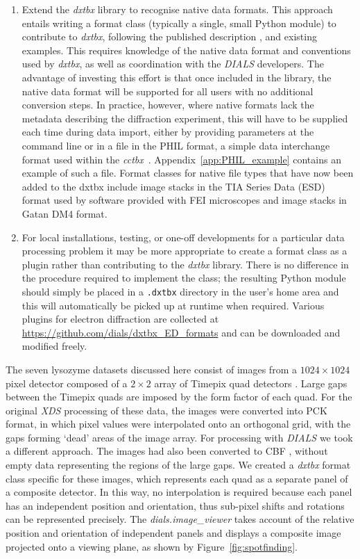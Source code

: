 \documentclass[preprint]{iucr}
\newcommand{\cctbx}{\emph{cctbx}\xspace}
\newcommand{\dxtbx}{\emph{dxtbx}\xspace}
\newcommand{\dials}{\emph{DIALS}\xspace}
\newcommand{\dialsimageviewer}{\emph{dials.image\_viewer}\xspace}
\newcommand{\code}{\texttt}
\newcommand{\xds}{\emph{XDS}\xspace}
\newcounter{DWCounter}
\newcommand{\DW}[1]{%
   \stepcounter{DWCounter}%
   {\color{red}{\textbf{DW \#\arabic{DWCounter}: }#1}}%
  }
\begin{document}
\begin{enumerate}
  \item Extend the \dxtbx library to recognise native data formats. This
  approach entails writing a format class (typically a single, small Python
  module) to contribute to \dxtbx, following the published description
  \cite{Parkhurst2014}, and existing examples. This requires knowledge of the
  native data format and conventions used by \dxtbx, as well as coordination
  with the \dials developers. The advantage of investing this effort is that
  once included in the library, the native data format will be supported for
  all users with no additional conversion steps. In practice, however, where
  native formats lack the metadata describing the diffraction experiment, this
  will have to be supplied each time during data import, either by providing
  parameters at the command line or in a file in the PHIL format, a simple data
  interchange format used within the \cctbx~\cite{Grosse-Kunstleve2002}.
  Appendix~\ref{app:PHIL_example} contains an example of such a file. Format
  classes for native file types that have now been added to the dxtbx include
  image stacks in the TIA Series Data (ESD) format used by software provided
  with FEI microscopes and image stacks in Gatan DM4 format.

  \item For local installations, testing, or one-off developments for a
  particular data processing problem it may be more appropriate to create a
  format class as a plugin rather than contributing to the \dxtbx library.
  There is no difference in the procedure required to implement the class; the
  resulting Python module should simply be placed in a \code{.dxtbx} directory
  in the user's home area and this will automatically be picked up at runtime
  when required. Various plugins for electron diffraction are collected at
  \url{https://github.com/dials/dxtbx_ED_formats} and can be downloaded and
  modified freely.

\end{enumerate}

The seven lysozyme datasets discussed here consist of images from a
$1024\times1024$ pixel detector composed of a $2\times2$ array of Timepix quad detectors
\cite{Clabbers2017}. Large gaps between the Timepix quads are imposed by the
form factor of each quad. For the original \xds processing of these data, the
images were converted into PCK format, in which pixel values were interpolated
onto an orthogonal grid, with the gaps forming `dead' areas of the image array.
For processing with \dials we took a different approach. The images had also
been converted to CBF \DW{some details here - from Tim?}, without empty data
representing the regions of the large gaps. We created a \dxtbx format class
specific for these images, which represents each quad as a separate panel of a
composite detector. In this way, no interpolation is required because each
panel has an independent position and orientation, thus sub-pixel shifts and
rotations can be represented precisely. The \dialsimageviewer takes account
of the relative position and orientation of independent panels and displays a
composite image projected onto a viewing plane, as shown by
Figure~\ref{fig:spotfinding}.
\end{document}
